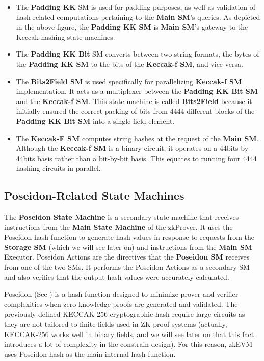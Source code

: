 \begin{itemize}
    
    \item The \textbf{Padding KK} SM is used for padding purposes, as well as validation of hash-related computations pertaining to the \textbf{Main SM}'s queries. As depicted in the above figure, the \textbf{Padding KK SM} is \textbf{Main SM}'s gateway to the Keccak hashing state machines.
    
    \item The \textbf{Padding KK Bit} SM converts between two string formats, the bytes of the \textbf{Padding KK SM} to the bits of the \textbf{Keccak-f SM}, and vice-versa.
    
    \item The \textbf{Bits2Field SM} is used specifically for parallelizing \textbf{Keccak-f SM} implementation. It acts as a multiplexer between the \textbf{Padding KK Bit SM} and the \textbf{Keccak-f SM}. This state machine is called \textbf{Bits2Field} because it initially ensured the correct packing of bits from 4444 different blocks of the \textbf{Padding KK Bit SM} into a single field element.
    
    \item The \textbf{Keccak-F SM} computes string hashes at the request of the \textbf{Main SM}. Although the \textbf{Keccak-f SM} is a binary circuit, it operates on a 44bits-by-44bits basis rather than a bit-by-bit basis. This equates to running four 4444 hashing circuits in parallel.
    
\end{itemize}

\subsection{Poseidon-Related State Machines}

The \textbf{Poseidon State Machine} is a secondary state machine that receives instructions from the \textbf{Main State Machine} of the zkProver. It uses the Poseidon hash function to generate hash values in response to requests from the \textbf{Storage SM} (which we will see later on) and instructions from the \textbf{Main SM} Executor. Poseidon Actions are the directives that the \textbf{Poseidon SM} receives from one of the two SMs. It performs the Poseidon Actions as a secondary SM and also verifies that the output hash values were accurately calculated.


Poseidon (See \cite{poseidon}) is a hash function designed to minimize prover and verifier complexities when zero-knowledge proofs are generated and validated. The previously defined KECCAK-256 cryptographic hash require large circuits as they are not tailored to finite fields used in ZK proof systems (actually, KECCAK-256 works well in binary fields, and we will see later on that this fact introduces a lot of complexity in the constrain design). For this reason, zkEVM uses Poseidon hash as the main internal hash function. 

